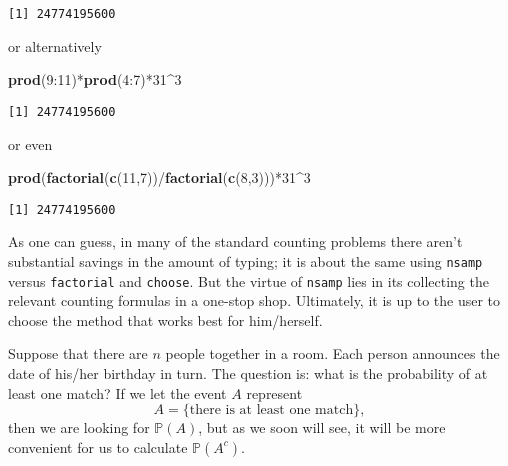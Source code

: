 \documentclass[]{book}
\newenvironment{Shaded}{\begin{snugshade}}{\end{snugshade}}
\newcommand{\KeywordTok}[1]{\textcolor[rgb]{0.13,0.29,0.53}{\textbf{{#1}}}}
\newcommand{\DecValTok}[1]{\textcolor[rgb]{0.00,0.00,0.81}{{#1}}}
\newcommand{\NormalTok}[1]{{#1}}
\numberwithin{equation}{chapter}
\numberwithin{figure}{chapter}
\theoremstyle{plain}
\theoremstyle{definition}
\theoremstyle{remark}
\theoremstyle{definition}
\theoremstyle{definition}
\theoremstyle{remark}
\let\BeginKnitrBlock\begin \let\EndKnitrBlock\end
\begin{document}
\begin{verbatim}
[1] 24774195600
\end{verbatim}

or alternatively

\begin{Shaded}
\begin{Highlighting}[]
\KeywordTok{prod}\NormalTok{(}\DecValTok{9}\NormalTok{:}\DecValTok{11}\NormalTok{)*}\KeywordTok{prod}\NormalTok{(}\DecValTok{4}\NormalTok{:}\DecValTok{7}\NormalTok{)*}\DecValTok{31}\NormalTok{^}\DecValTok{3} 
\end{Highlighting}
\end{Shaded}

\begin{verbatim}
[1] 24774195600
\end{verbatim}

or even

\begin{Shaded}
\begin{Highlighting}[]
\KeywordTok{prod}\NormalTok{(}\KeywordTok{factorial}\NormalTok{(}\KeywordTok{c}\NormalTok{(}\DecValTok{11}\NormalTok{,}\DecValTok{7}\NormalTok{))/}\KeywordTok{factorial}\NormalTok{(}\KeywordTok{c}\NormalTok{(}\DecValTok{8}\NormalTok{,}\DecValTok{3}\NormalTok{)))*}\DecValTok{31}\NormalTok{^}\DecValTok{3} 
\end{Highlighting}
\end{Shaded}

\begin{verbatim}
[1] 24774195600
\end{verbatim}

As one can guess, in many of the standard counting problems there aren't
substantial savings in the amount of typing; it is about the same using
\texttt{nsamp} versus \texttt{factorial} and \texttt{choose}. But the
virtue of \texttt{nsamp} lies in its collecting the relevant counting
formulas in a one-stop shop. Ultimately, it is up to the user to choose
the method that works best for him/herself.

\bigskip

\BeginKnitrBlock{example}[The Birthday Problem]
\protect\hypertarget{ex:unnamed-chunk-149}{}{\label{ex:unnamed-chunk-149}
\iffalse (The Birthday Problem) \fi }Suppose that there are \(n\) people
together in a room. Each person announces the date of his/her birthday
in turn. The question is: what is the probability of at least one match?
If we let the event \(A\) represent \[ A = \{ \mbox{there is at least
one match}\}, \] then we are looking for \(\mathbb{P}(A)\), but as we
soon will see, it will be more convenient for us to calculate
\(\mathbb{P}(A^{c})\).
\EndKnitrBlock{example}
\end{document}
